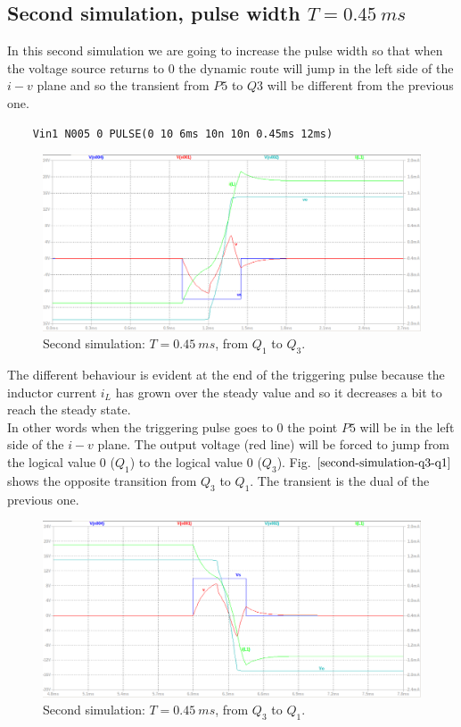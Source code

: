 \documentclass[letterpaper,11pt]{article}
\begin{document}
\subsection{Second simulation, pulse width $T=0.45\ ms$}
In this second simulation we are going to increase the pulse width so that when the voltage source returns to $0$ the dynamic route will jump in the left side of the $i-v$ plane and so the transient from $P5$ to $Q3$ will be different from the previous one.
\begin{verbatim}
    Vin1 N005 0 PULSE(0 10 6ms 10n 10n 0.45ms 12ms)
\end{verbatim}
\begin{figure}[!ht]
        \centering \includegraphics[width=0.8\columnwidth]{second-simulation-Q1-Q3.png}
        \caption{\label{second-simulation-q1-q3}Second simulation: $T=0.45\ ms$, from $Q_1$ to $Q_3$.
        }
\end{figure}
The different behaviour is evident at the end of the triggering pulse because the inductor current $i_L$ has grown over the steady value and so it decreases a bit to reach the steady state.\\
In other words when the triggering pulse goes to $0$ the point $P5$ will be in the left side of the $i-v$ plane. The output voltage (red line) will be forced to jump from the logical value $0$ ($Q_1$) to the logical value $0$ ($Q_3$). Fig. $\ref{second-simulation-q3-q1}$ shows the opposite transition from $Q_3$ to $Q_1$. The transient is the dual of the previous one.
\begin{figure}[!ht]
        \centering \includegraphics[width=0.8\columnwidth]{second-simulation-Q3-Q1.png}
        \caption{\label{second-simulation-q3-q1}Second simulation: $T=0.45\ ms$, from $Q_3$ to $Q_1$.
        }
\end{figure}
%
\clearpage
%
\newpage
%
\end{document}
